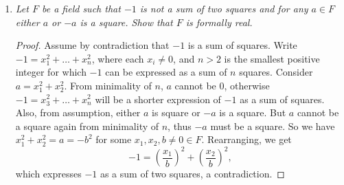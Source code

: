 \documentclass{article}
\begin{document}
\begin{enumerate}[label={\bf Q\arabic*:}]
\begin{proof}
      Thus from compactness theorem, $T:= T_{\mathbb{Q}(t),\mathcal{L}}\cup
      T_{\text{lin ring}}\cup T_{t>\mathbb{Q}}$ is satisfiable. Any model
      that satisfies $T$ must embed $\mathbb{Q}(t)$ elementarily as a field
      since this model satisfies the complete diagram of $\mathbb{Q}(t)$ in
      the language $\mathcal{L}$ of fields. Also, since a subset of a set
      that satisfies $T_{\text{lin ring}}$ will also satisfy $T_{\text{lin
      ring}}$, the embedded $\mathbb{Q}(t)$ will be an ordered field.
      Finally, this embedded $\mathbb{Q}(t)$ will contain $t$ that
      satisfies $T_{t>\mathbb{Q}}$, and thus have an ordering where $t$ is
      larger than all rationals in $\mathbb{Q}$.
    \end{proof}

  \item \it Let $F$ be a field such that $-1$ is not a sum of two squares
    and for any $a\in F$ either $a$ or $-a$ is a square. Show that $F$ is
    formally real.

    \begin{proof}
      Assume by contradiction that $-1$ is a sum of squares. Write
      $-1=x_1^2+\ldots+x_n^2$, where each $x_i\neq0$, and $n>2$ is the
      smallest positive integer for which $-1$ can be expressed as a sum of
      $n$ squares. Consider $a=x_1^2+x_2^2$. From minimality of $n$, $a$
      cannot be 0, otherwise $-1=x_3^2+\ldots+x_n^2$ will be a shorter
      expression of $-1$ as a sum of squares. Also, from assumption, either
      $a$ is square or $-a$ is a square. But $a$ cannot be a square again
      from minimality of $n$, thus $-a$ must be a square. So we have
      $x_1^2+x_2^2=a=-b^2$ for some $x_1,x_2,b\neq0\in F$. Rearranging, we
      get
      \[-1 =\left(\frac{x_1}{b}\right)^2 +\left(\frac{x_2}{b}\right)^2,\]
      which expresses $-1$ as a sum of two squares, a contradiction.
    \end{proof}
\end{enumerate}
\end{document}
